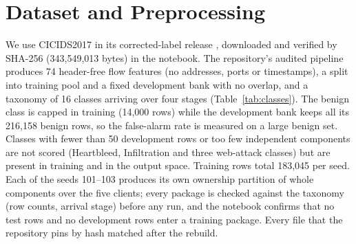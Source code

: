 \documentclass[10pt,a4paper]{article}
\begin{document}
\section{Dataset and Preprocessing}\label{sec:data}
We use CICIDS2017 \cite{dataset} in its corrected-label release \cite{engelen}, downloaded and verified by SHA-256 (343,549,013 bytes) in the notebook. The repository's audited pipeline produces 74 header-free flow features (no addresses, ports or timestamps), a split into training pool and a fixed development bank with no overlap, and a taxonomy of 16 classes arriving over four stages (Table~\ref{tab:classes}). The benign class is capped in training (14,000 rows) while the development bank keeps all its 216,158 benign rows, so the false-alarm rate is measured on a large benign set. Classes with fewer than 50 development rows or too few independent components are not scored (Heartbleed, Infiltration and three web-attack classes) but are present in training and in the output space. Training rows total 183,045 per seed. Each of the seeds 101--103 produces its own ownership partition of whole components over the five clients; every package is checked against the taxonomy (row counts, arrival stage) before any run, and the notebook confirms that no test rows and no development rows enter a training package. Every file that the repository pins by hash matched after the rebuild.
\end{document}
